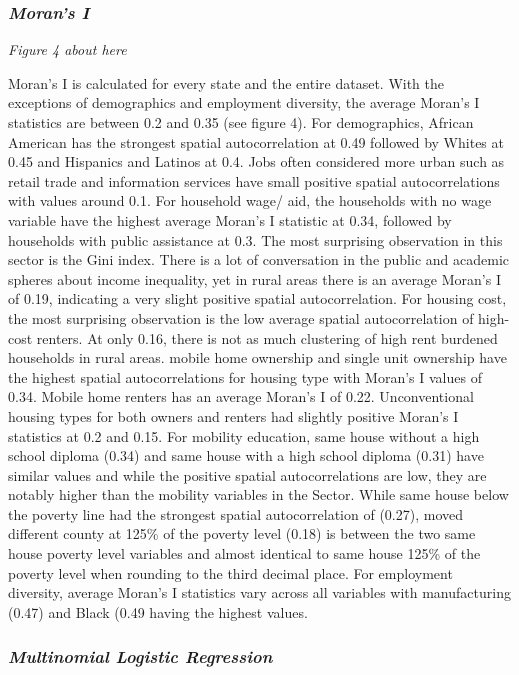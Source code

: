 \subsubsection{\textit{Moran's I}}

\textit{Figure 4 about here}

Moran’s I is calculated for every state and the entire dataset. With the exceptions of demographics and employment diversity, the average Moran's I statistics are between 0.2 and 0.35 (see figure 4). For demographics, African American has the strongest spatial autocorrelation at 0.49 followed by Whites at 0.45 and Hispanics and Latinos at 0.4. Jobs often considered more urban such as retail trade and information services have small positive spatial autocorrelations with values around 0.1. For household wage/ aid, the households with no wage variable have the highest average Moran’s I statistic at 0.34, followed by households with public assistance at 0.3. The most surprising observation in this sector is the Gini index. There is a lot of conversation in the public and academic spheres about income inequality, yet in rural areas there is an average Moran’s I of 0.19, indicating a very slight positive spatial autocorrelation. For housing cost, the most surprising observation is the low average spatial autocorrelation of high-cost renters. At only 0.16, there is not as much clustering of high rent burdened households in rural areas. mobile home ownership and single unit ownership have the highest spatial autocorrelations for housing type with Moran’s I values of 0.34.  Mobile home renters has an average Moran’s I of 0.22. Unconventional housing types for both owners and renters had slightly positive Moran’s I statistics at 0.2 and 0.15. For mobility education, same house without a high school diploma (0.34) and same house with a high school diploma (0.31) have similar values and while the positive spatial autocorrelations are low, they are notably higher than the mobility variables in the Sector. While same house below the poverty line had the strongest spatial autocorrelation of (0.27), moved different county at 125\% of the poverty level (0.18) is between the two same house poverty level variables and almost identical to same house 125\% of the poverty level when rounding to the third decimal place. For employment diversity, average Moran’s I statistics vary across all variables with manufacturing (0.47) and Black (0.49 having the highest values.  


\subsubsection{\textit{Multinomial Logistic Regression}}

